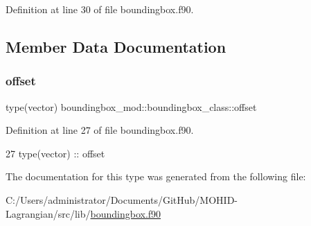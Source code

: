 Definition at line 30 of file boundingbox.\+f90.



\subsection{Member Data Documentation}
\mbox{\label{structboundingbox__mod_1_1boundingbox__class_a49a3cc9011829c2e1fbbbffa76580f63}} 
\subsubsection{\texorpdfstring{offset}{offset}}
{\footnotesize\ttfamily type(vector) boundingbox\+\_\+mod\+::boundingbox\+\_\+class\+::offset\hspace{0.3cm}{\ttfamily [private]}}



Definition at line 27 of file boundingbox.\+f90.


\begin{DoxyCode}
27   \textcolor{keywordtype}{type}(vector) :: offset
\end{DoxyCode}


The documentation for this type was generated from the following file\+:\begin{DoxyCompactItemize}
\item 
C\+:/\+Users/administrator/\+Documents/\+Git\+Hub/\+M\+O\+H\+I\+D-\/\+Lagrangian/src/lib/\mbox{\hyperlink{boundingbox_8f90}{boundingbox.\+f90}}\end{DoxyCompactItemize}
